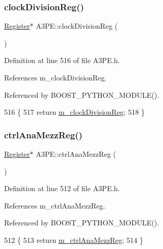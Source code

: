 \subsubsection{\texorpdfstring{clock\+Division\+Reg()}{clockDivisionReg()}}
{\footnotesize\ttfamily \hyperlink{classRegister}{Register}$\ast$ A3\+P\+E\+::clock\+Division\+Reg (\begin{DoxyParamCaption}{ }\end{DoxyParamCaption})\hspace{0.3cm}{\ttfamily [inline]}}



Definition at line 516 of file A3\+P\+E.\+h.



References m\+\_\+clock\+Division\+Reg.



Referenced by B\+O\+O\+S\+T\+\_\+\+P\+Y\+T\+H\+O\+N\+\_\+\+M\+O\+D\+U\+L\+E().


\begin{DoxyCode}
516                               \{
517     \textcolor{keywordflow}{return} \hyperlink{classA3PE_ae1f4c24a99c2e6ae944a080f429cc155}{m\_clockDivisionReg};
518   \}
\end{DoxyCode}
\mbox{\label{classA3PE_aa94c6120a73194d69dc5761cf90a4800}} 
\subsubsection{\texorpdfstring{ctrl\+Ana\+Mezz\+Reg()}{ctrlAnaMezzReg()}}
{\footnotesize\ttfamily \hyperlink{classRegister}{Register}$\ast$ A3\+P\+E\+::ctrl\+Ana\+Mezz\+Reg (\begin{DoxyParamCaption}{ }\end{DoxyParamCaption})\hspace{0.3cm}{\ttfamily [inline]}}



Definition at line 512 of file A3\+P\+E.\+h.



References m\+\_\+ctrl\+Ana\+Mezz\+Reg.



Referenced by B\+O\+O\+S\+T\+\_\+\+P\+Y\+T\+H\+O\+N\+\_\+\+M\+O\+D\+U\+L\+E().


\begin{DoxyCode}
512                             \{
513     \textcolor{keywordflow}{return} \hyperlink{classA3PE_a126a936a5fd4fd4b83485b3637e1fa84}{m\_ctrlAnaMezzReg};
514   \}
\end{DoxyCode}
\mbox{\label{classA3PE_ae5fc5dac92af2b34a41be388586647be}} 
